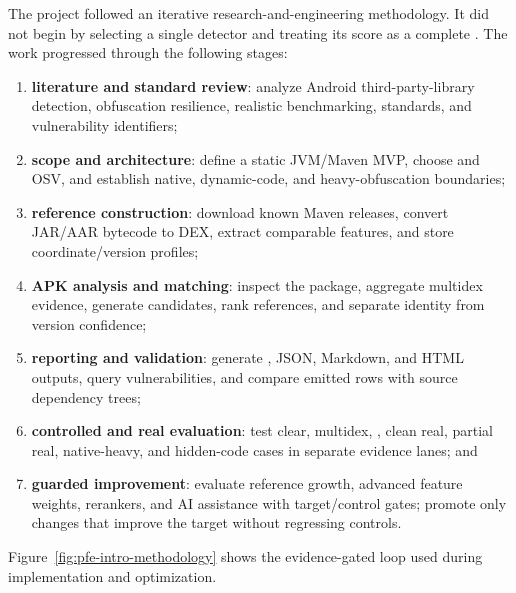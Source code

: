 The project followed an iterative research-and-engineering methodology. It did
not begin by selecting a single detector and treating its score as a complete
\SBOM. The work progressed through the following stages:

\begin{enumerate}
  \item \textbf{literature and standard review}: analyze Android
  third-party-library detection, obfuscation resilience, realistic
  benchmarking, \SBOM standards, and vulnerability identifiers;
  \item \textbf{scope and architecture}: define a static JVM/Maven MVP,
  choose \CycloneDX and OSV, and establish native, dynamic-code, and
  heavy-obfuscation boundaries;
  \item \textbf{reference construction}: download known Maven releases,
  convert JAR/AAR bytecode to DEX, extract comparable features, and store
  coordinate/version profiles;
  \item \textbf{APK analysis and matching}: inspect the package, aggregate
  multidex evidence, generate candidates, rank references, and separate
  identity from version confidence;
  \item \textbf{reporting and validation}: generate \SBOM, JSON, Markdown, and
  HTML outputs, query vulnerabilities, and compare emitted rows with source
  dependency trees;
  \item \textbf{controlled and real evaluation}: test clear, multidex,
  \Reight, clean real, partial real, native-heavy, and hidden-code cases in
  separate evidence lanes; and
  \item \textbf{guarded improvement}: evaluate reference growth, advanced
  feature weights, rerankers, and AI assistance with target/control gates;
  promote only changes that improve the target without regressing controls.
\end{enumerate}

Figure~\ref{fig:pfe-intro-methodology} shows the evidence-gated loop used
during implementation and optimization.

